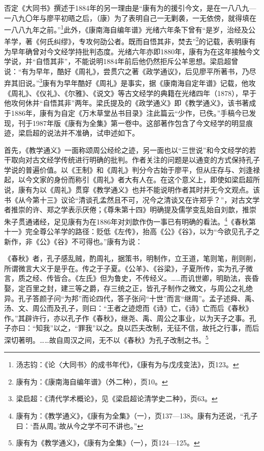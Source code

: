 \documentclass[a4paper, 12pt, openright]{ctexbook}
\renewenvironment{quote}
  {\list{}{\rightmargin2\ccwd \leftmargin2\ccwd \itemindent=2\ccwd \listparindent=2\ccwd}%
   \item\relax\small\kaishu\color{black}}
  {\endlist}
\begin{document}
否定《大同书》撰述于1884年的另一理由是“康有为的援引今文，是在一八八九—一八九〇年与廖平初晤之后，（康）为了表明自己一无剿袭，一无依傍，就得填在一八八九年之前。”\footnote{汤志钧：《论〈大同书〉的成书年代》，《康有为与戊戌变法》，页123。}此外，《康南海自编年谱》光绪六年条下曾有“是岁，治经及公羊学，著《何氏纠缪》，专攻何劭公者。既而自悟其非，焚去”\footnote{康有为：《康南海自编年谱》（外二种），页10。}的记载，表明康有为早年确曾对今文经学持批判态度。光绪六年亦即1880年，康有为在这年接触今文学说，并“自悟其非”，不能说明1884年前后他仍然拒斥公羊思想。梁启超曾说：“有为早年，酷好《周礼》，尝贯穴之著《政学通议》，后见廖平所著书，乃尽弃其旧说。”\footnote{梁启超：《清代学术概论》，见《梁启超论清学史二种》，页63。}康有为早年酷好《周礼》是事实，据《康南海自定年谱》记载，他攻《周礼》、《仪礼》、《尔雅》、《说文》等古文经学的典籍在光绪四年（1878），早于他攻何休并“自悟其非”两年。梁氏提及的《政学通义》即《教学通义》，该书著成于1886年，康有为自定《万木草堂丛书目录》注此篇云“少作，已佚。”手稿今已发现，刊于1987年版《康有为全集》第一卷中。这部著作包含了今文经学的明显痕迹，梁启超的说法并不准确，试申述如下。

首先，《教学通义》一面称颂周公经纶之迹，另一面也以“三世说”和今文经学的若干取向对古文经学传统进行明确的批判。作者关注的问题是以通变的方式保持孔子学说的普遍价值。以《王制》和《周礼》判分今古始于廖平，但从庄存与、刘逢禄起，以今文家的身份而称引《周礼》者大有人在。在这个意义上，即使如梁启超所说，康有为以《周礼》贯穿《教学通义》也并不能说明作者其时并无今文观点。该书《从今第十三》议论“清谈孔孟然且不可，况今之清谈又在许郑乎？”，对古文学者推崇的许、郑之学表示厌倦；《尊朱第十四》明确提及儒学变乱始自刘歆，推崇朱子贯通诸经，足见康有为在1886年对刘歆作伪一事已有明确的看法。\footnote{康有为：《教学通义》，《康有为全集》（一），页137—138。康有为还说，“孔子曰：‘吾从周。’故从今之学不可不讲也。”}《春秋第十一》完全尊公羊学的路径：贬低《左传》，抬高《公》《谷》，以为“今欲见孔子之新作，非《公》《谷》不可得也。”康有为说：

\begin{quote}
《春秋》者，孔子感乱贼，酌周礼，据策书，明制作，立王道，笔则笔，削则削，所谓微言大义于是乎在。传之于子夏。《公羊》、《谷梁》，子夏所传，实为孔子微言，质之经、传皆合。《左氏》但为鲁史，不传经义。……而讥世卿，明助法，丧昏娶，定百里之封，建三等之爵，存三统之正，皆孔子制作之微文，与周公之礼绝异。孔子答颜子问“为邦”而论四代，答子张问“十世”而言“继周”。孟子述舜、禹、汤、文、周公而及孔子，则曰：“王者之迹熄而《诗》亡，《诗》亡而后《春秋》作。”其辟许行，亦以孔子作《春秋》，继尧、禹、周公之事业，以为天子之事。孔子亦曰：“知我”以之，“罪我”以之。良以匹夫改制，无征不信，故托之行事，而后深切著明。……故自周汉之间，无不以《春秋》为孔子改制之书。\footnote{康有为《教学通义》，《康有为全集》（一），页124—125。}
\end{quote}
\end{document}
